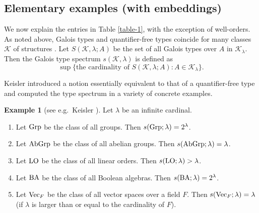 \documentclass[10pt]{amsart}
\numberwithin{equation}{section}
\theoremstyle{plain}
\theoremstyle{definition}
\newtheorem{example}[theorem]{Example}
\newcommand{\K}{\mathcal{K}}
\begin{document}
\subsection{Elementary examples (with embeddings)}\label{sec:elementary-example-embedding}



We now explain the entries in Table \ref{table-1}, with the exception of well-orders.
As noted above, Galois types and quantifier-free types coincide for many classes $\K$ of structures \cite[Remark 3.8]{Vas17}.
Let $S(\K,\lambda;A)$ be the set of all Galois types over $A$ in $\K_\lambda$.
Then the Galois type spectrum $s(\K,\lambda)$ is defined as 
\[\sup\{\mbox{the cardinality of }S(\K,\lambda;A):A\in\K_\lambda\}.\]

Keisler \cite{Kei76} introduced a notion essentially equivalent to that of a quantifier-free type and computed the type spectrum in a variety of concrete examples.
\begin{example}[see e.g.~Keisler \cite{Kei76}]
Let $\lambda$ be an infinite cardinal.
\begin{enumerate}
\item Let ${\rm Grp}$ be the class of all groups.
Then $s({\rm Grp};\lambda)=2^\lambda$.
\item Let ${\rm AbGrp}$ be the class of all abelian groups.
Then $s({\rm AbGrp};\lambda)=\lambda$.
\item Let ${\rm LO}$ be the class of all linear orders.
Then $s({\rm LO};\lambda)>\lambda$.
\item Let ${\rm BA}$ be the class of all Boolean algebras.
Then $s({\rm BA};\lambda)=2^\lambda$.
\item Let ${\rm Vec}_F$ be the class of all vector spaces over a field $F$.
Then $s({\rm Vec}_F;\lambda)=\lambda$ (if $\lambda$ is larger than or equal to the cardinality of $F$).
\end{enumerate}
\end{example}
\end{document}
